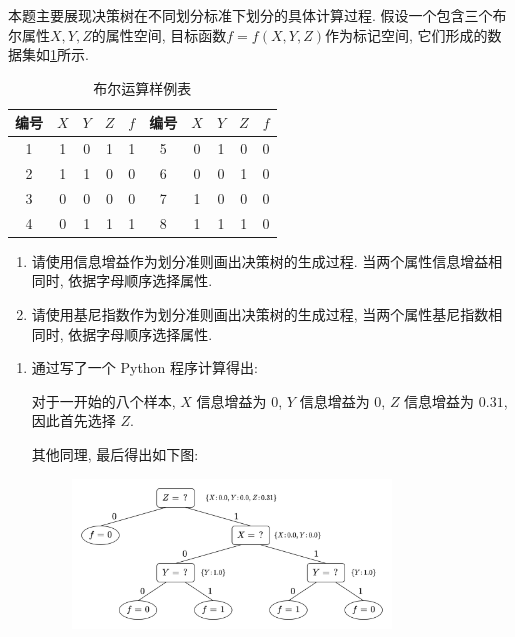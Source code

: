 \documentclass[answers]{exam}  %
\begin{document}
\begin{questions}
  本题主要展现决策树在不同划分标准下划分的具体计算过程. 假设一个包含三个布尔属性$X, Y, Z$的属性空间, 目标函数$f=f(X, Y, Z)$作为标记空间, 它们形成的数据集如\ref{ch4_tab:bool_table}所示.
  \begin{table}[ht]
    \centering
    \caption{布尔运算样例表}\label{ch4_tab:bool_table}
    \tabcolsep 15pt
    \begin{tabular}{cccc|c||cccc|c}
      \hline
      编号     & $X$ & $Y$ & $Z$ & $f$ & 编号 & $X$ & $Y$ & $Z$ & $f$ \\
      \hline 1 & 1   & 0   & 1   & 1   & 5    & 0   & 1   & 0   & 0   \\
      2        & 1   & 1   & 0   & 0   & 6    & 0   & 0   & 1   & 0   \\
      3        & 0   & 0   & 0   & 0   & 7    & 1   & 0   & 0   & 0   \\
      4        & 0   & 1   & 1   & 1   & 8    & 1   & 1   & 1   & 0   \\
      \hline
    \end{tabular}
  \end{table}
  \begin{enumerate}
    \item 请使用信息增益作为划分准则画出决策树的生成过程. 当两个属性信息增益相同时, 依据字母顺序选择属性.
    \item 请使用基尼指数作为划分准则画出决策树的生成过程, 当两个属性基尼指数相同时, 依据字母顺序选择属性.
  \end{enumerate}

  \begin{solution}
    \begin{enumerate}
      \item

            通过写了一个 Python 程序计算得出:

            对于一开始的八个样本, $X$ 信息增益为 $0$, $Y$ 信息增益为 $0$, $Z$ 信息增益为 $0.31$, 因此首先选择 $Z$.

            其他同理, 最后得出如下图:

            \begin{figure}[H]
              \centering
              \includegraphics[width=0.8\textwidth]{./figure/PS3-2-1.png}
              \label{Fig.main1}
            \end{figure}


\end{enumerate}
\end{solution}
\end{questions}
\end{document}
